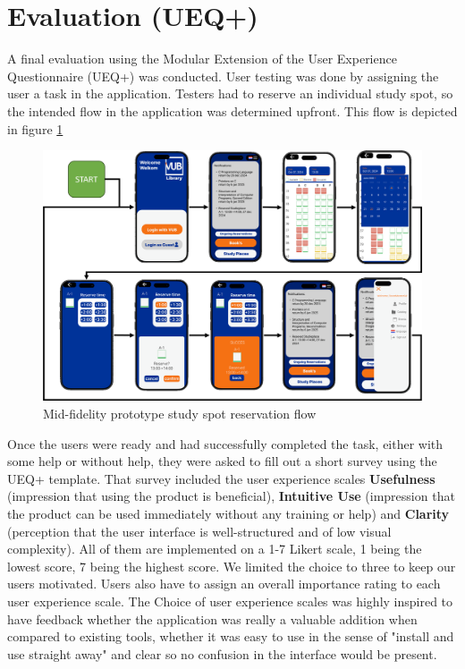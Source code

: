 \documentclass[a4paper, 11pt]{article}
\begin{document}
\section{Evaluation (UEQ+)}
A final evaluation using the Modular Extension of the User Experience Questionnaire (UEQ+)\cite{ueq} was conducted. User testing was done by assigning the user a task in the application. Testers had to reserve an individual study spot, so the intended flow in the application was determined upfront. This flow is depicted in figure \ref{fig:figma}
\begin{figure}[h]
	\centering
	\includegraphics[width=1.0\linewidth]{figures/FigmaReserveSpot}
	\caption{Mid-fidelity prototype study spot reservation flow}
	\label{fig:figma}
\end{figure}
Once the users were ready and had successfully completed the task, either with some help or without help, they were asked to fill out a short survey using the UEQ+ template. That survey included the user experience scales \textbf{Usefulness} (impression that using the product is beneficial), \textbf{Intuitive Use} (impression that the product can be used immediately without any training or help) and \textbf{Clarity} (perception that the user interface is well-structured and of low visual complexity). All of them are implemented on a 1-7 Likert scale, 1 being the lowest score, 7 being the highest score. We limited the choice to three to keep our users motivated. Users also have to assign an overall importance rating to each user experience scale. The Choice of user experience scales was highly inspired to have feedback whether the application was really a valuable addition when compared to existing tools, whether it was easy to use in the sense of "install and use straight away" and clear so no confusion in the interface would be present.\\
\end{document}
